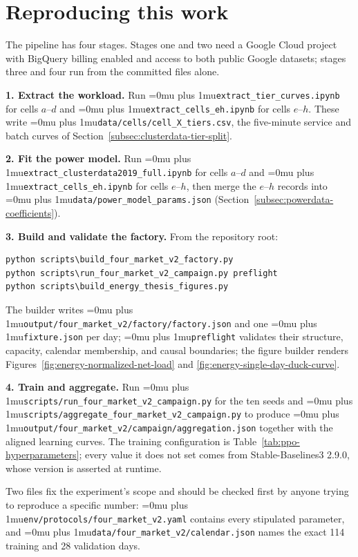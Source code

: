 ﻿\documentclass[12pt]{article}
\newcommand{\codepath}[1]{{\Urlmuskip=0mu plus 1mu\relax\nolinkurl{#1}}}
\begin{document}
\appendix

\section{Reproducing this work}
\label{app:reproduction}

The pipeline has four stages. Stages one and two need a Google Cloud project
with BigQuery billing enabled and access to both public Google datasets;
stages three and four run from the committed files alone.

\textbf{1. Extract the workload.} Run \codepath{extract_tier_curves.ipynb} for
cells \(a\)--\(d\) and \codepath{extract_cells_eh.ipynb} for cells
\(e\)--\(h\). These write \codepath{data/cells/cell_X_tiers.csv}, the
five-minute service and batch curves of
Section~\ref{subsec:clusterdata-tier-split}.

\textbf{2. Fit the power model.} Run
\codepath{extract_clusterdata2019_full.ipynb} for cells \(a\)--\(d\) and
\codepath{extract_cells_eh.ipynb} for cells \(e\)--\(h\), then merge the
\(e\)--\(h\) records into \codepath{data/power_model_params.json}
(Section~\ref{subsec:powerdata-coefficients}).

\textbf{3. Build and validate the factory.} From the repository root:

\begin{verbatim}
python scripts\build_four_market_v2_factory.py
python scripts\run_four_market_v2_campaign.py preflight
python scripts\build_energy_thesis_figures.py
\end{verbatim}

The builder writes \codepath{output/four_market_v2/factory/factory.json} and one
\codepath{fixture.json} per day; \codepath{preflight} validates their structure,
capacity, calendar membership, and causal boundaries; the figure builder renders
Figures~\ref{fig:energy-normalized-net-load} and
\ref{fig:energy-single-day-duck-curve}.

\textbf{4. Train and aggregate.} Run
\codepath{scripts/run_four_market_v2_campaign.py} for the ten seeds and
\codepath{scripts/aggregate_four_market_v2_campaign.py} to produce
\codepath{output/four_market_v2/campaign/aggregation.json} together with the
aligned learning curves. The training configuration is
Table~\ref{tab:ppo-hyperparameters}; every value it does not set comes from
Stable-Baselines3 2.9.0, whose version is asserted at runtime.

Two files fix the experiment's scope and should be checked first by anyone
trying to reproduce a specific number:
\codepath{env/protocols/four_market_v2.yaml} contains every stipulated
parameter, and \codepath{data/four_market_v2/calendar.json} names the exact 114
training and 28 validation days.
\end{document}
